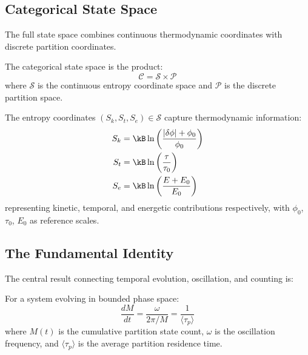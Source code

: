 \subsection{Categorical State Space}

The full state space combines continuous thermodynamic coordinates with discrete partition coordinates.

\begin{definition}
\label{def:statespace}
The categorical state space is the product:
\begin{equation}
    \mathcal{C} = \mathcal{S} \times \mathcal{P}
\end{equation}
where $\mathcal{S}$ is the continuous entropy coordinate space and $\mathcal{P}$ is the discrete partition space.
\end{definition}

The entropy coordinates $(S_k, S_t, S_e) \in \mathcal{S}$ capture thermodynamic information:
\begin{align}
    S_k &= \kB \ln\left(\frac{|\delta\phi| + \phi_0}{\phi_0}\right) \\
    S_t &= \kB \ln\left(\frac{\tau}{\tau_0}\right) \\
    S_e &= \kB \ln\left(\frac{E + E_0}{E_0}\right)
\end{align}
representing kinetic, temporal, and energetic contributions respectively, with $\phi_0$, $\tau_0$, $E_0$ as reference scales.

\subsection{The Fundamental Identity}

The central result connecting temporal evolution, oscillation, and counting is:

\begin{theorem}
\label{thm:fundamental}
For a system evolving in bounded phase space:
\begin{equation}
    \frac{dM}{dt} = \frac{\omega}{2\pi/M} = \frac{1}{\langle\tau_p\rangle}
\end{equation}
where $M(t)$ is the cumulative partition state count, $\omega$ is the oscillation frequency, and $\langle\tau_p\rangle$ is the average partition residence time.
\end{theorem}

